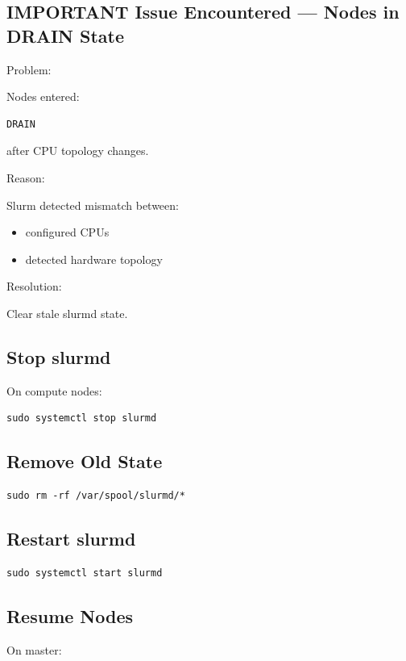 \documentclass[11pt]{article}
\begin{document}
\subsection{IMPORTANT Issue Encountered — Nodes in DRAIN State}
\label{sec:orgeaa7a40}

Problem:

Nodes entered:

\begin{verbatim}
DRAIN
\end{verbatim}

after CPU topology changes.

Reason:

Slurm detected mismatch between:
\begin{itemize}
\item configured CPUs
\item detected hardware topology
\end{itemize}

Resolution:

Clear stale slurmd state.
\subsection{Stop slurmd}
\label{sec:orgc734b06}

On compute nodes:

\begin{verbatim}
sudo systemctl stop slurmd
\end{verbatim}
\subsection{Remove Old State}
\label{sec:orge8a42a1}

\begin{verbatim}
sudo rm -rf /var/spool/slurmd/*
\end{verbatim}
\subsection{Restart slurmd}
\label{sec:org9ec00ab}

\begin{verbatim}
sudo systemctl start slurmd
\end{verbatim}
\subsection{Resume Nodes}
\label{sec:orgd1563a5}

On master:
\end{document}
